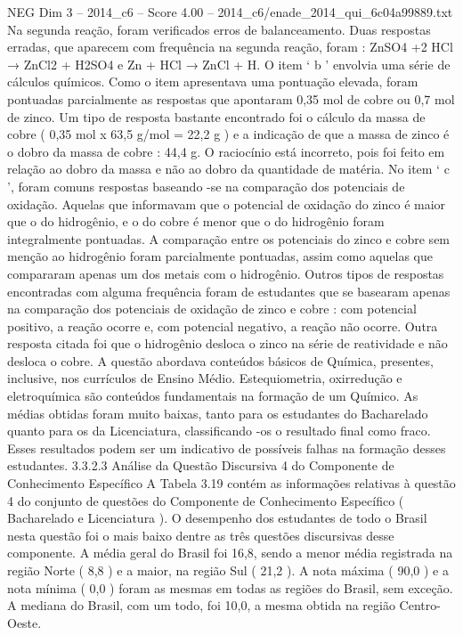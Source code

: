\begin{textsample}{NEG Dim 3 – 2014\_c6 – Score 4.00 – 2014\_c6/enade\_2014\_qui\_6c04a99889.txt}
Na segunda reação, foram verificados erros de balanceamento.
Duas respostas erradas, que aparecem com frequência na segunda reação, foram : ZnSO4 +2 HCl → ZnCl2 + H2SO4 e Zn + HCl → ZnCl + H.
O item ‘ b ’ envolvia uma série de cálculos químicos.
Como o item apresentava uma pontuação elevada, foram pontuadas parcialmente as respostas que apontaram 0,35 mol de cobre ou 0,7 mol de zinco.
Um tipo de resposta bastante encontrado foi o cálculo da massa de cobre ( 0,35 mol x 63,5 g/mol = 22,2 g ) e a indicação de que a massa de zinco é o dobro da massa de cobre : 44,4 g.
O raciocínio está incorreto, pois foi feito em relação ao dobro da massa e não ao dobro da quantidade de matéria.
No item ‘ c ’, foram comuns respostas baseando -se na comparação dos potenciais de oxidação.
Aquelas que informavam que o potencial de oxidação do zinco é maior que o do hidrogênio, e o do cobre é menor que o do hidrogênio foram integralmente pontuadas.
A comparação entre os potenciais do zinco e cobre sem menção ao hidrogênio foram parcialmente pontuadas, assim como aquelas que compararam apenas um dos metais com o hidrogênio.
Outros tipos de respostas encontradas com alguma frequência foram de estudantes que se basearam apenas na comparação dos potenciais de oxidação de zinco e cobre : com potencial positivo, a reação ocorre e, com potencial negativo, a reação não ocorre.
Outra resposta citada foi que o hidrogênio desloca o zinco na série de reatividade e não desloca o cobre.
A questão abordava conteúdos básicos de Química, presentes, inclusive, nos currículos de Ensino Médio.
Estequiometria, oxirredução e eletroquímica são conteúdos fundamentais na formação de um Químico.
As médias obtidas foram muito baixas, tanto para os estudantes do Bacharelado quanto para os da Licenciatura, classificando -os o resultado final como fraco.
Esses resultados podem ser um indicativo de possíveis falhas na formação desses estudantes. 3.3.2.3 Análise da Questão Discursiva 4 do Componente de Conhecimento Específico A Tabela 3.19 contém as informações relativas à questão 4 do conjunto de questões do Componente de Conhecimento Específico ( Bacharelado e Licenciatura ).
O desempenho dos estudantes de todo o Brasil nesta questão foi o mais baixo dentre as três questões discursivas desse componente.
A média geral do Brasil foi 16,8, sendo a menor média registrada na região Norte ( 8,8 ) e a maior, na região Sul ( 21,2 ).
A nota máxima ( 90,0 ) e a nota mínima ( 0,0 ) foram as mesmas em todas as regiões do Brasil, sem exceção.
A mediana do Brasil, com um todo, foi 10,0, a mesma obtida na região Centro-Oeste.

\end{textsample}
